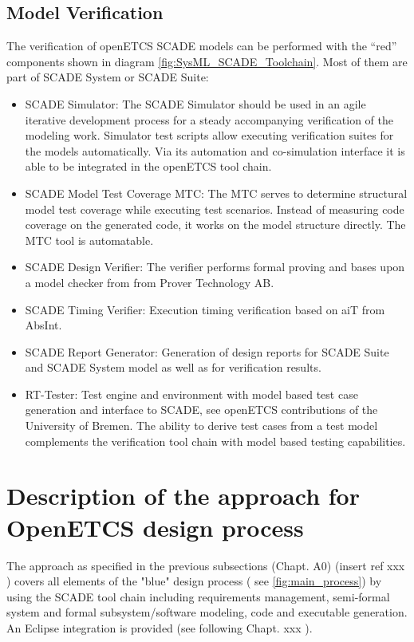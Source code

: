 \subsection{Model Verification}
\label{sec:SysML_SCADE_ModelVerification}

The verification of openETCS SCADE models can be performed with the "`red"' components shown in diagram \ref{fig:SysML_SCADE_Toolchain}. Most of them are part of SCADE System or SCADE Suite:

\begin{itemize}
	\item SCADE Simulator: The SCADE Simulator should be used in an agile iterative development process for a steady accompanying verification of the modeling work. Simulator test scripts allow executing verification suites for the models automatically. Via its automation and co-simulation interface it is able to be integrated in the openETCS tool chain. 
	\item  SCADE Model Test Coverage MTC: The MTC serves to determine structural model test coverage while executing test scenarios. Instead of measuring code coverage on the generated code, it works on the model structure directly. The MTC tool is automatable. 
	\item SCADE Design Verifier: The verifier performs formal proving and bases upon a model checker from from Prover Technology AB.  
	\item SCADE Timing Verifier: Execution timing verification based on aiT from AbsInt.
	\item SCADE Report Generator: Generation of design reports for SCADE Suite and SCADE System model as well as for verification results. 
	\item RT-Tester: Test engine and environment with model based test case generation and interface to SCADE, see openETCS contributions of the University of Bremen. The ability to derive test cases from a test model complements the verification tool chain with model based testing capabilities.  
\end{itemize}
  

\section{Description of the approach for OpenETCS design process}

The approach as specified in the previous subsections (Chapt. A0) (insert ref xxx ) covers all elements of the "blue" design process ( see \ref{fig:main_process}) 
by using the SCADE tool chain including requirements management, semi-formal system and formal subsystem/software modeling, code and executable generation. 
An Eclipse integration is provided (see following Chapt. xxx ). 

